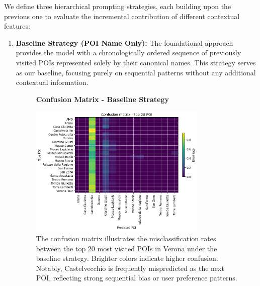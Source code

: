 \documentclass[12pt,a4paper]{article}
\begin{document}
We define three hierarchical prompting strategies, each building upon the previous one to evaluate the incremental contribution of different contextual features:

\begin{enumerate}

\item \textbf{Baseline Strategy (POI Name Only):} The foundational approach provides the model with a chronologically ordered sequence of previously visited POIs represented solely by their canonical names. This strategy serves as our baseline, focusing purely on sequential patterns without any additional contextual information.

\begin{figure}[H]
\centering
\textbf{Confusion Matrix - Baseline Strategy}\par
\vspace{0.5em}
\includegraphics[width=0.8\textwidth]{../img/no_SPACE-GEO_n-1_come_current_POI/confusion_matrix.png}
\caption{The confusion matrix illustrates the misclassification rates between the top 20 most visited POIs in Verona under the baseline strategy. Brighter colors indicate higher confusion. Notably, Castelvecchio is frequently mispredicted as the next POI, reflecting strong sequential bias or user preference patterns.
}
\label{fig:baseline_confusion}
\end{figure}


\end{enumerate}
\end{document}
